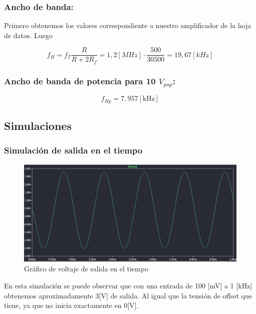 \subsubsection{Ancho de banda:}

 Primero obtenemos los valores correspondiente a nuestro amplificador de la hoja de datos. Luego
 
\[ f_H = f_{T} \frac{R}{R+2 R_f} = 1,2 [MHz] \cdot \frac{500}{30500} = 19,67 [kHz] \]

\subsubsection{Ancho de banda de potencia para 10 \texorpdfstring{$V_{pap}$}{Vpap}:}
\[ f_{Hp}=7,957[\mathrm{kHz}] \]

  
 
\newpage

\subsection{Simulaciones}
\subsubsection{Simulación de salida en el tiempo}
 
\begin{figure}[h!]
    \centering
    \includegraphics[width=0.80\linewidth]{img/tiempo.png}
    \caption{Gráfico de voltaje de salida en el tiempo}
    \label{fig:1b_tiempo}
\end{figure}

En esta simulación se puede observar que con una entrada de 100 [mV] a 1 [kHz] obtenemos aproximadamente 3[V] de salida. Al igual que la tensión de offset que tiene, ya que no inicia exactamente en 0[V].

